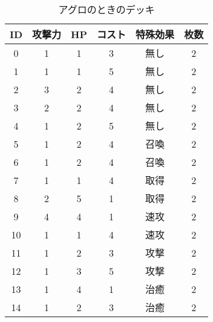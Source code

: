 \documentclass{jarticle}     %
\begin{document}
  \begin{table}[h]
    \centering
    \caption{アグロのときのデッキ}
    \label{table:agurodeck}
    \begin{tabular}{|c|c|c|c|c|c|}

    \hline
    ID & 攻撃力 & HP & コスト & 特殊効果 & 枚数 \\ \hline
    0 & 1 & 1 & 3 & 無し & 2 \\ \hline
    1 & 1 & 1 & 5 & 無し & 2 \\ \hline
    2 & 3 & 2 & 4 & 無し & 2 \\ \hline
    3 & 2 & 2 & 4 & 無し & 2 \\ \hline
    4 & 1 & 2 & 5 & 無し & 2 \\ \hline
    5 & 1 & 2 & 4 & 召喚 & 2 \\ \hline
    6 & 1 & 2 & 4 & 召喚 & 2 \\ \hline
    7 & 1 & 1 & 4 & 取得 & 2 \\ \hline
    8 & 2 & 5 & 1 & 取得 & 2 \\ \hline
    9 & 4 & 4 & 1 & 速攻 & 2 \\ \hline
    10 & 1 & 1 & 4 & 速攻 & 2 \\ \hline
    11 & 1 & 2 & 3 & 攻撃 & 2 \\ \hline
    12 & 1 & 3 & 5 & 攻撃 & 2 \\ \hline
    13 & 1 & 4 & 1 & 治癒 & 2 \\ \hline
    14 & 1 & 2 & 3 & 治癒 & 2 \\ \hline
    \end{tabular}
    \end{table}
  
\end{document}
